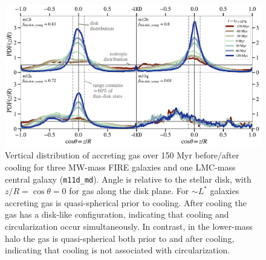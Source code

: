 \documentclass[fleqn,usenatbib]{mnras}
\newcommand{\Rcon}{R_{T=10^5\,{\rm K}}}
\begin{document}

\begin{figure}
    \centering
    \includegraphics[width=\textwidth]{figures/theta_vs_t.pdf}
    \caption{
    Vertical distribution of accreting gas over 150 Myr before/after cooling for three MW-mass FIRE galaxies and one LMC-mass central galaxy (\texttt{m11d\_md}).
    Angle is relative to the stellar disk, with $z/R = \cos\theta=0$ for gas along the disk plane.
    For $\sim L^*$ galaxies accreting gas is quasi-spherical prior to cooling.
    After cooling the gas has a disk-like configuration, indicating that cooling and circularization occur simultaneously. 
    In contrast, in the lower-mass halo the gas is quasi-spherical both prior to and after cooling, indicating that cooling is not associated with circularization.
    }
    \label{f: theta vs t}
\end{figure}
\end{document}
